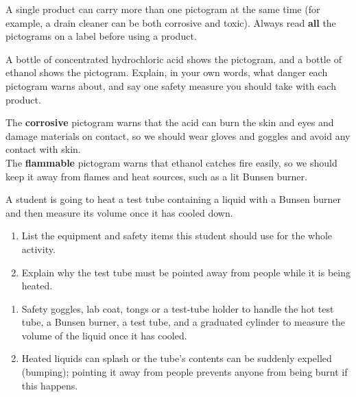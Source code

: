 \begin{impt}
    A single product can carry more than one pictogram at the same time (for example, a drain cleaner can be both corrosive and toxic). Always read \textbf{all} the pictograms on a label before using a product.
\end{impt}

\begin{exercise}
    A bottle of concentrated hydrochloric acid shows the  pictogram, and a bottle of ethanol shows the  pictogram. Explain, in your own words, what danger each pictogram warns about, and say one safety measure you should take with each product.
    \begin{solu}
        The \textbf{corrosive} pictogram warns that the acid can burn the skin and eyes and damage materials on contact, so we should wear gloves and goggles and avoid any contact with skin. \\
        The \textbf{flammable} pictogram warns that ethanol catches fire easily, so we should keep it away from flames and heat sources, such as a lit Bunsen burner.
    \end{solu}
\end{exercise}

\begin{exercise}
    A student is going to heat a test tube containing a liquid with a Bunsen burner and then measure its volume once it has cooled down.
    \begin{enumerate}[label=\letraminuscula]
        \item List the equipment and safety items this student should use for the whole activity.
        \item Explain why the test tube must be pointed away from people while it is being heated.
    \end{enumerate}
    \begin{solu}
        \begin{enumerate}[label=\alph*)]
            \item Safety goggles, lab coat, tongs or a test-tube holder to handle the hot test tube, a Bunsen burner, a test tube, and a graduated cylinder to measure the volume of the liquid once it has cooled.
            \item Heated liquids can splash or the tube's contents can be suddenly expelled (bumping); pointing it away from people prevents anyone from being burnt if this happens.
        \end{enumerate}
    \end{solu}
\end{exercise}


